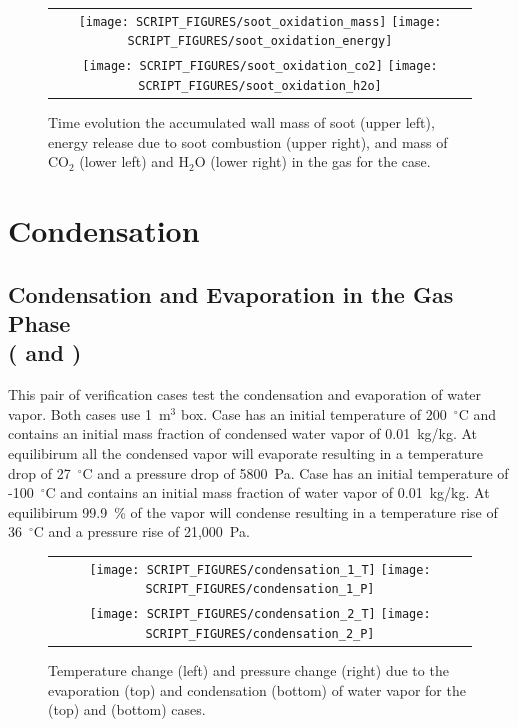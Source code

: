 \documentclass[11pt]{book}
\begin{document}
\begin{figure}[ht]
	\centering
	\begin{tabular}{c}
		\texttt{[image: SCRIPT\_FIGURES/soot\_oxidation\_mass]}
		\texttt{[image: SCRIPT\_FIGURES/soot\_oxidation\_energy]} \\
		\texttt{[image: SCRIPT\_FIGURES/soot\_oxidation\_co2]}
		\texttt{[image: SCRIPT\_FIGURES/soot\_oxidation\_h2o]}
	\end{tabular}
	\caption[Results of the  case]{Time evolution the accumulated wall mass of soot (upper left), energy release due to soot combustion (upper right), and mass of CO$_2$ (lower left) and H$_2$O (lower right) in the gas for the  case.}
	\label{fig:soot_oxidation}
\end{figure}

\section{Condensation}
\subsection{Condensation and Evaporation in the Gas Phase\\(\texorpdfstring{ and }{condensation\_1 and condensation\_2})}
	\label{condensation_evaporation}
This pair of verification cases test the condensation and evaporation of water vapor. Both cases use 1~m$^3$ box. Case  has an initial temperature of 200~$^\circ$C and contains an initial mass fraction of condensed water vapor of 0.01~kg/kg. At equilibirum all the condensed vapor will evaporate resulting in a temperature drop of 27~$^\circ$C and a pressure drop of 5800~Pa. Case  has an initial temperature of -100~$^\circ$C and contains an initial mass fraction of water vapor of 0.01~kg/kg. At equilibirum 99.9~\% of the vapor will condense resulting in a temperature rise of 36~$^\circ$C and a pressure rise of 21,000~Pa.

\begin{figure}[ht]
	\centering
	\begin{tabular}{c}
		\texttt{[image: SCRIPT\_FIGURES/condensation\_1\_T]}
		\texttt{[image: SCRIPT\_FIGURES/condensation\_1\_P]} \\
		\texttt{[image: SCRIPT\_FIGURES/condensation\_2\_T]}
		\texttt{[image: SCRIPT\_FIGURES/condensation\_2\_P]}
	\end{tabular}
	\caption[Results of the  (top) and  (bottom) cases]{Temperature change (left) and pressure change (right) due to the evaporation (top) and condensation (bottom) of water vapor for the  (top) and  (bottom) cases.}
	\label{fig:condensation_gas}
\end{figure}
\end{document}
